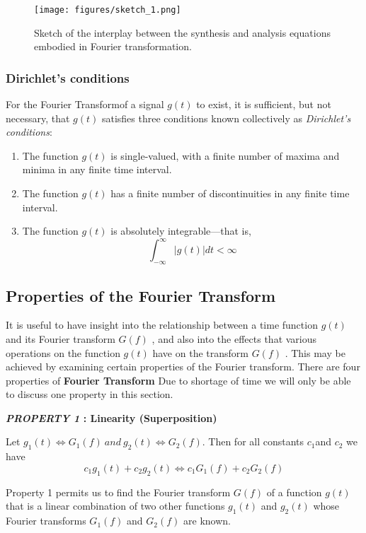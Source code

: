 \documentclass{article}
\newcommand{\FT}{Fourier Transform}
\begin{document}
\begin{figure}[h!]
    \centering
    \texttt{[image: figures/sketch\_1.png]}
    \caption{Sketch of the interplay
between the synthesis and analysis
equations embodied in Fourier
transformation.}
    \label{fig:f1}
\end{figure}

\subsubsection{Dirichlet’s conditions}
For the \FT of a signal $g(t) $ to exist, it is sufficient, but not necessary,
that $g(t)$ satisfies three conditions known collectively as \textit{Dirichlet’s conditions}:
\begin{enumerate}
    \item The function $g(t) $  is single-valued, with a finite number of maxima and minima in any
finite time interval.
    \item The function $g(t)$  has a finite number of discontinuities in any finite time interval.
    \item The function $g(t)$ is absolutely integrable—that is,
    \begin{equation*}
        \int_{-\infty}^{\infty} | g(t) | dt < \infty
    \end{equation*}

\end{enumerate}

\subsection{Properties of the Fourier Transform}
It is useful to have insight into the relationship between a time function  $g(t)$   and its Fourier
transform  $G(f)$  , and also into the effects that various operations on the function  $g(t)$   have
on the transform  $G(f)$  . This may be achieved by examining certain properties of the Fourier
transform.
There are four properties of \textbf{Fourier Transform}
Due to shortage of time we will only be able to discuss one property in this section.\par
\textbf{\textit{PROPERTY 1} : Linearity (Superposition)}
\par Let $g_1(t) \Longleftrightarrow G_1(f) ~and~ g_2(t) \Longleftrightarrow G_2(f) $. Then for
all constants $ c_1 $and $c_2$ we have $$ c_{1}g_{1}(t) + c_{2}g_{2}(t) \Longleftrightarrow c_{1}G_{1}(f) + c_{2}G_{2}(f) $$

Property 1 permits us to find the Fourier transform $G(f)$ of a function  $g(t)$  that is a
linear combination of two other functions  $g_1(t)$  and  $g_2(t)$  whose Fourier transforms  $G_1(f)$
and $G_2(f)$ are known.
\end{document}

